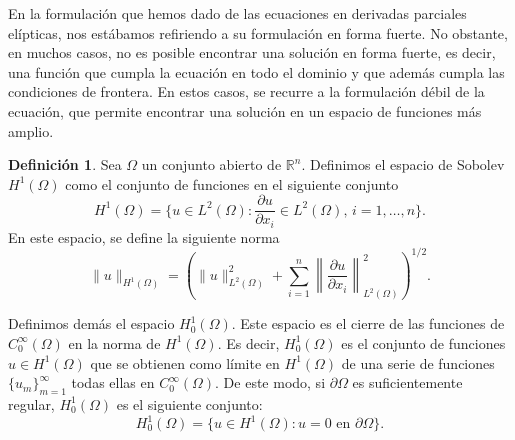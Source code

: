 \documentclass[a4paper,11pt,spanish, twoside, leqno]{tfg-uam}
\theoremstyle{definition}
\newtheorem{defin}[teor]{Definici\'on}
\begin{document}
En la formulación que hemos dado de las ecuaciones en derivadas parciales elípticas, nos estábamos refiriendo a su formulación en forma fuerte. No obstante, en muchos casos, no es posible encontrar una solución en forma fuerte, es decir, una función que cumpla la ecuación en todo el dominio y que además cumpla las condiciones de frontera. En estos casos, se recurre a la  formulación débil de la ecuación, que permite encontrar una solución en un espacio de funciones más amplio. 

\begin{mdframed}
\begin{defin}
    Sea $\Omega$ un conjunto abierto de $\mathbb{R}^n$. Definimos el espacio de Sobolev $H^1(\Omega)$ como el conjunto de funciones en el siguiente conjunto
    \begin{equation}
        H^1(\Omega)=\{u\in L^2(\Omega): \frac{\partial u}{\partial x_i}\in L^2(\Omega), \, i=1,\dots,n\}.
    \end{equation}
    En este espacio, se define la siguiente norma
    \begin{equation}
        \|u\|_{H^1(\Omega)}=\left(\|u\|^2_{L^2(\Omega)} + \sum_{i=1}^{n}\left\|\frac{\partial u}{\partial x_i}\right\|^2_{L^2(\Omega)}\right)^{1/2}.
    \end{equation}
\end{defin}
\end{mdframed}
    
Definimos demás el espacio $H_0^1(\Omega)$. Este espacio es el cierre de las funciones de $C_0^\infty(\Omega)$ en la norma de $H^1(\Omega)$. Es decir, $H_0^1(\Omega)$ es el conjunto de funciones $u\in H^1(\Omega)$ que se obtienen como límite en $H^1(\Omega)$ de una serie de funciones $\{u_m\}_{m=1}^\infty$ todas ellas en $C_0^\infty(\Omega)$. De este modo, si $\partial\Omega$ es suficientemente regular, $H_0^1(\Omega)$ es el siguiente conjunto:
\begin{equation}
    H_0^1(\Omega)=\{u\in H^1(\Omega): u=0 \text{ en } \partial\Omega\}.
\end{equation}
\end{document}
